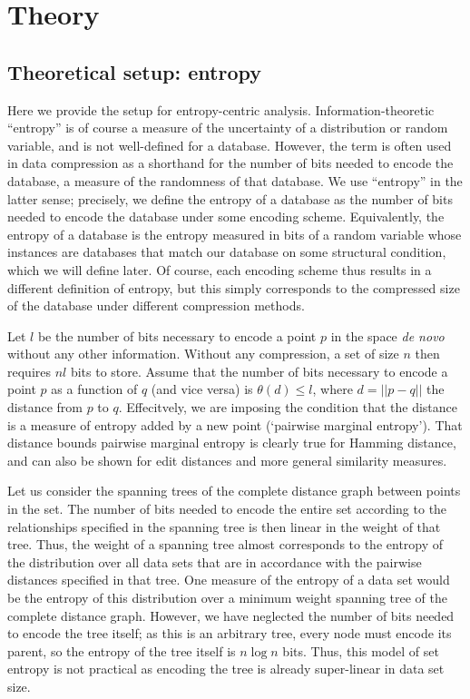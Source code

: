 \documentclass{amsbook}
\theoremstyle{definition}
\theoremstyle{remark}
\numberwithin{equation}{section}
\begin{document}
\section{Theory}

\subsection{Theoretical setup: entropy}
Here we provide the setup for entropy-centric analysis.
Information-theoretic ``entropy'' is of course a measure of the uncertainty of a distribution or random variable, and is not well-defined for a database.
However, the term is often used in data compression as a shorthand for the number of bits needed to encode the database, a measure of the randomness of that database.
We use ``entropy'' in the latter sense; precisely, we define the entropy of a database as the number of bits needed to encode the database under some encoding scheme.
Equivalently, the entropy of a database is the entropy measured in bits of a random variable whose instances are databases that match our database on some structural condition, which we will define later.
Of course, each encoding scheme thus results in a different definition of entropy, but this simply corresponds to the compressed size of the database under different compression methods.

Let $l$ be the number of bits necessary to encode a point $p$ in the space \textit{de novo} without any other information.
Without any compression, a set of size $n$ then requires $nl$ bits to store.
Assume that the number of bits necessary to encode a point $p$ as a function of $q$ (and vice versa) is $\theta(d) \le l$, where $d = ||p -q||$ the distance from $p$ to $q$.
Effecitvely, we are imposing the condition that the distance is a measure of entropy added by a new point (`pairwise marginal entropy').
That distance bounds pairwise marginal entropy is clearly true for Hamming distance, and can also be shown for edit distances and more general similarity measures.

Let us consider the spanning trees of the complete distance graph between points in the set.
The number of bits needed to encode the entire set according to the relationships specified in the spanning tree is then linear in the weight of that tree.
Thus, the weight of a spanning tree almost corresponds to the entropy of the distribution over all data sets that are in accordance with the pairwise distances specified in that tree.
One measure of the entropy of a data set would be the entropy of this distribution over a minimum weight spanning tree of the complete distance graph.
However, we have neglected the number of bits needed to encode the tree itself; as this is an arbitrary tree, every node must encode its parent, so the entropy of the tree itself is $n \log n$ bits.
Thus, this model of set entropy is not practical as encoding the tree is already super-linear in data set size.
\end{document}
